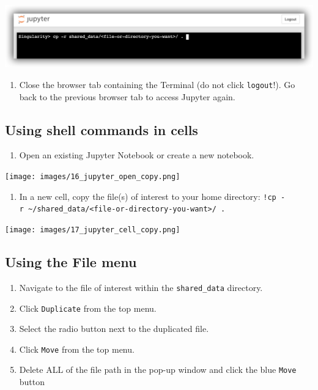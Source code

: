 \documentclass[]{book}
\providecommand{\tightlist}{%
  \setlength{\itemsep}{0pt}\setlength{\parskip}{0pt}}
\begin{document}
\includegraphics{images/15_jupyter_copy_terminal.png}

\begin{enumerate}
\def\labelenumi{\arabic{enumi}.}
\setcounter{enumi}{3}
\tightlist
\item
  Close the browser tab containing the Terminal (do not click \texttt{logout}!). Go back to the previous browser tab to access Jupyter again.
\end{enumerate}

\hypertarget{using-shell-commands-in-cells}{%
\subsection{Using shell commands in cells}\label{using-shell-commands-in-cells}}

\begin{enumerate}
\def\labelenumi{\arabic{enumi}.}
\tightlist
\item
  Open an existing Jupyter Notebook or create a new notebook.
\end{enumerate}

\texttt{[image: images/16\_jupyter\_open\_copy.png]}

\begin{enumerate}
\def\labelenumi{\arabic{enumi}.}
\setcounter{enumi}{1}
\tightlist
\item
  In a new cell, copy the file(s) of interest to your home directory: \texttt{!cp\ -r\ \textasciitilde{}/shared\_data/\textless{}file-or-directory-you-want\textgreater{}/\ .}
\end{enumerate}

\texttt{[image: images/17\_jupyter\_cell\_copy.png]}

\hypertarget{using-the-file-menu-1}{%
\subsection{Using the File menu}\label{using-the-file-menu-1}}

\begin{enumerate}
\def\labelenumi{\arabic{enumi}.}
\tightlist
\item
  Navigate to the file of interest within the \texttt{shared\_data} directory.
\item
  Click \texttt{Duplicate} from the top menu.
\item
  Select the radio button next to the duplicated file.
\item
  Click \texttt{Move} from the top menu.
\item
  Delete ALL of the file path in the pop-up window and click the blue \texttt{Move} button
\end{enumerate}
\end{document}
